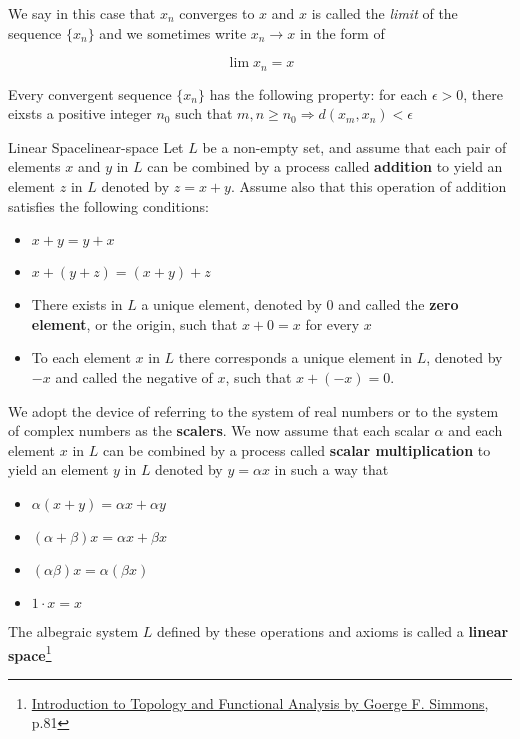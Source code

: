 We say in this case that $x_n$ converges to $x$ and $x$ is called the \textit{limit} of the sequence $\{ x_n \}$ and we
sometimes write $x_n \rightarrow x$ in the form of

\[ \lim x_n = x \]

Every convergent sequence $\{ x_n \}$ has the following property: for each $\epsilon > 0$, there eixsts a positive
integer $n_0$ such that $m, n \ge n_0 \Rightarrow d(x_m, x_n) < \epsilon$



\begin{Definition}{Linear Space}{linear-space}
    Let $L$ be a non-empty set, and assume that each pair of elements $x$ and $y$ in $L$ can be combined by a process
    called \textbf{addition} to yield an element $z$ in $L$ denoted by $z = x + y$. Assume also that this operation of
    addition satisfies the following conditions:

    \begin{itemize}
        \item $x + y = y + x$
        \item $x + (y + z) = (x + y) + z$
        \item There exists in $L$ a unique element, denoted by $0$ and called the \textbf{zero element}, or the origin,
              such that $x + 0 = x$ for every $x$
        \item To each element $x$ in $L$ there corresponds a unique element in $L$, denoted by $-x$ and called the
              negative of $x$, such that $x + (-x) = 0$.
    \end{itemize}

    We adopt the device of referring to the system of real numbers or to the system of complex numbers as the
    \textbf{scalers}. We now assume that each scalar $\alpha$ and each element $x$ in $L$ can be combined by a process
    called \textbf{scalar multiplication} to yield an element $y$ in $L$ denoted by $y = \alpha x$ in such a way that

    \begin{itemize}
        \item $\alpha(x + y) = \alpha x + \alpha y$
        \item $(\alpha + \beta)x = \alpha x + \beta x$
        \item $(\alpha\beta)x = \alpha(\beta x)$
        \item $1 \cdot x = x$
    \end{itemize}

    The albegraic system $L$ defined by these operations and axioms is called a
    \textbf{linear space}\footnote{\href{https://trello.com/c/3EPccNTa}{Introduction to Topology and Functional Analysis by Goerge F. Simmons}, p.81}
\end{Definition}


